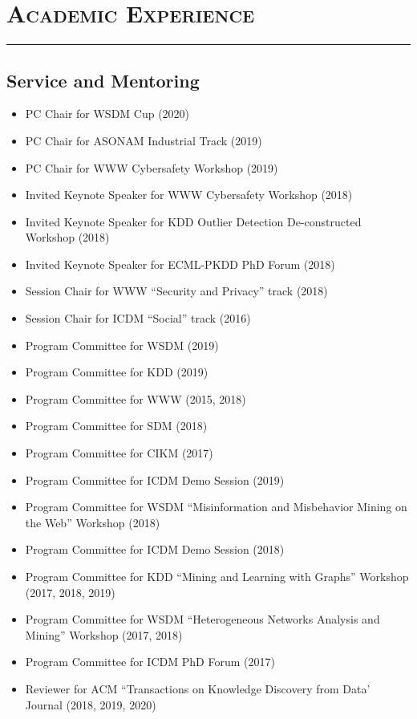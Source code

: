 \documentclass{article}
\newcommand{\HRule}{\rule{\linewidth}{0.5mm}}
\begin{document}
\section*{\bf \textsc{Academic Experience}}
\vspace{-5mm}\HRule

\subsection*{\bf {Service and Mentoring}}

\begin{itemize}
  \item PC Chair for WSDM Cup (2020)    
  \item PC Chair for ASONAM Industrial Track (2019)
  \item PC Chair for WWW Cybersafety Workshop (2019)
  \item Invited Keynote Speaker for WWW Cybersafety Workshop (2018)
  \item Invited Keynote Speaker for KDD Outlier Detection De-constructed Workshop (2018)
  \item Invited Keynote Speaker for ECML-PKDD PhD Forum (2018)
  \item Session Chair for WWW ``Security and Privacy'' track (2018)
  \item Session Chair for ICDM ``Social'' track (2016)
  \item Program Committee for WSDM (2019)
  \item Program Committee for KDD (2019)
  \item Program Committee for WWW (2015, 2018)
  \item Program Committee for SDM (2018)
  \item Program Committee for CIKM (2017)
  \item Program Committee for ICDM Demo Session (2019)
   \item Program Committee for WSDM ``Misinformation and Misbehavior Mining on the Web'' Workshop (2018)
    \item Program Committee for  ICDM Demo Session (2018)
   \item Program Committee for KDD ``Mining and Learning with Graphs'' Workshop (2017, 2018, 2019)
 \item Program Committee for WSDM ``Heterogeneous Networks Analysis and Mining'' Workshop (2017, 2018)
 \item Program Committee for  ICDM PhD Forum (2017)
 \item Reviewer for ACM ``Transactions on Knowledge Discovery from Data' Journal (2018, 2019, 2020)

\end{itemize}
\end{document}
